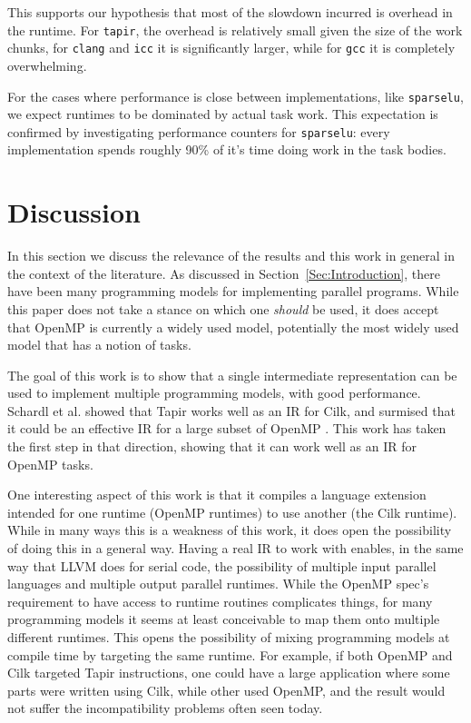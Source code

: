 \documentclass[sigconf]{acmart}
\begin{document}
This supports our hypothesis that most of the slowdown incurred is overhead in
the runtime. For \texttt{tapir}, the overhead is relatively small given the
size of the work chunks, for \texttt{clang} and \texttt{icc} it is
significantly larger, while for \texttt{gcc} it is completely overwhelming.

For the cases where performance is close between implementations, like
\texttt{sparselu}, we expect runtimes to be dominated by actual task work. This 
expectation is confirmed by investigating performance counters for \texttt{sparselu}:
every implementation spends roughly 90\% of it's time doing work in the task
bodies. 

\section{Discussion} \label{Sec:Discussion}

In this section we discuss the relevance of the results and this work in general
in the context of the literature. As discussed in Section~\ref{Sec:Introduction}, 
there have been many programming models for implementing parallel programs. While
this paper does not take a stance on which one \emph{should} be used, it does
accept that OpenMP is currently a widely used model, potentially the most
widely used model that has a notion of tasks. 

The goal of this work is to show that a single intermediate representation can be
used to implement multiple programming models, with good performance. Schardl et 
al. showed that Tapir works well as an IR for Cilk, and surmised that it could
be an effective IR for a large subset of OpenMP \cite{tapir}. This work has
taken the first step in that direction, showing that it can work well as an IR
for OpenMP tasks. 

One interesting aspect of this work is that it compiles a language extension intended
for one runtime (OpenMP runtimes) to use another (the Cilk runtime). While in many
ways this is a weakness of this work, it does open the possibility of doing this 
in a general way. Having a real IR to work with enables, in the same way that LLVM
does for serial code, the possibility of multiple input parallel languages and
multiple output parallel runtimes. While the OpenMP spec's requirement to
have access to runtime routines complicates things, for many programming models
it seems at least conceivable to map them onto multiple different runtimes. This
opens the possibility of mixing programming models at compile time by targeting
the same runtime. For example, if both OpenMP and Cilk targeted Tapir
instructions, one could have a large application where some parts were written
using Cilk, while other used OpenMP, and the result would not suffer the
incompatibility problems often seen today. 
\end{document}
